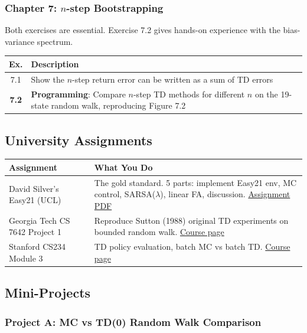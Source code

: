 \documentclass[11pt,letterpaper]{article}
\begin{document}
\subsubsection{Chapter 7: $n$-step Bootstrapping}

Both exercises are essential. Exercise 7.2 gives hands-on experience with the bias-variance spectrum.

\begin{longtable}{@{}cp{4.8in}@{}}
\toprule
\textbf{Ex.} & \textbf{Description} \\
\midrule
\endhead
7.1 & Show the $n$-step return error can be written as a sum of TD errors \\
\textbf{7.2} & \textbf{Programming}: Compare $n$-step TD methods for different $n$ on the 19-state random walk, reproducing Figure 7.2 \\
\bottomrule
\end{longtable}

\subsection{University Assignments}

\begin{longtable}{@{}p{2in}p{3.8in}@{}}
\toprule
\textbf{Assignment} & \textbf{What You Do} \\
\midrule
\endhead
David Silver's Easy21 (UCL) & The gold standard. 5 parts: implement Easy21 env, MC control, SARSA($\lambda$), linear FA, discussion. \href{https://www.davidsilver.uk/wp-content/uploads/2020/03/Easy21-Johannes.pdf}{Assignment PDF} \\
\addlinespace
Georgia Tech CS 7642 Project 1 & Reproduce Sutton (1988) original TD experiments on bounded random walk. \href{https://omscs.gatech.edu/cs-7642-reinforcement-learning}{Course page} \\
\addlinespace
Stanford CS234 Module 3 & TD policy evaluation, batch MC vs batch TD. \href{https://web.stanford.edu/class/cs234/}{Course page} \\
\bottomrule
\end{longtable}

\subsection{Mini-Projects}

\subsubsection{Project A: MC vs TD(0) Random Walk Comparison}
\end{document}
